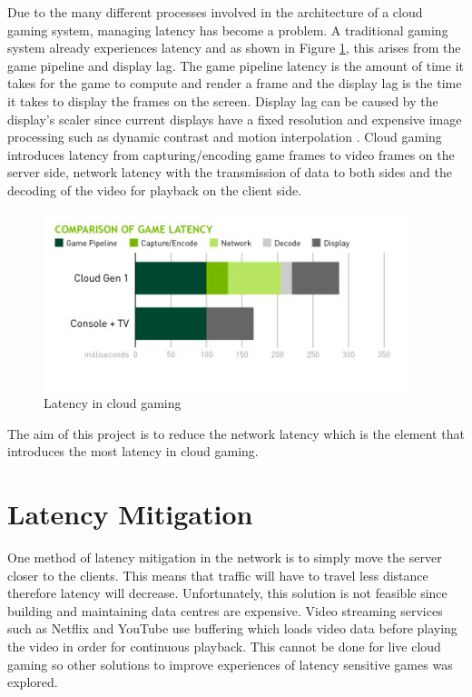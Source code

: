 Due to the many different processes involved in the architecture of a cloud gaming system, managing latency has become a problem. A traditional gaming system already experiences latency and as shown in Figure \ref{fig:latency}, this arises from the game pipeline and display lag. The game pipeline latency is the amount of time it takes for the game to compute and render a frame and the display lag is the time it takes to display the frames on the screen. Display lag can be caused by the display's scaler since current displays have a fixed resolution and expensive image processing such as dynamic contrast and motion interpolation \cite{displaylag}. Cloud gaming introduces latency from capturing/encoding game frames to video frames on the server side, network latency with the transmission of data to both sides and the decoding of the video for playback on the client side.
\clearpage
\begin{figure}[h!]
 \centering
 \includegraphics[width=\linewidth]{images/latency.png}
 \caption{Latency in cloud gaming \cite{cloudlatency}}
 \label{fig:latency}
\end{figure}

The aim of this project is to reduce the network latency which is the element that introduces the most latency in cloud gaming.

\section{Latency Mitigation}
One method of latency mitigation in the network is to simply move the server closer to the clients. This means that traffic will have to travel less distance therefore latency will decrease. Unfortunately, this solution is not feasible since building and maintaining data centres are expensive. Video streaming services such as Netflix and YouTube use buffering which loads video data before playing the video in order for continuous playback. This cannot be done for live cloud gaming so other solutions to improve experiences of latency sensitive games was explored.

